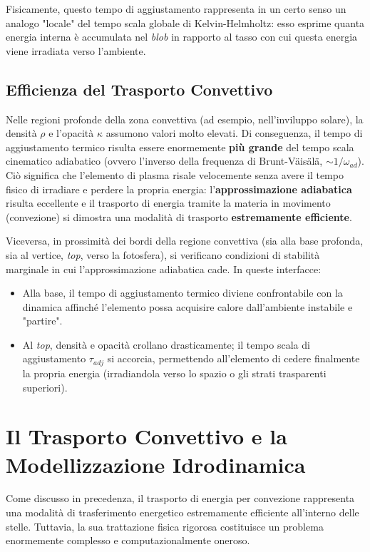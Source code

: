 Fisicamente, questo tempo di aggiustamento rappresenta in un certo senso un analogo "locale" del tempo scala globale di Kelvin-Helmholtz: esso esprime quanta energia interna è accumulata nel \textit{blob} in rapporto al tasso con cui questa energia viene irradiata verso l'ambiente.

\subsection{Efficienza del Trasporto Convettivo}

Nelle regioni profonde della zona convettiva (ad esempio, nell'inviluppo solare), la densità $\rho$ e l'opacità $\kappa$ assumono valori molto elevati. Di conseguenza, il tempo di aggiustamento termico risulta essere enormemente \textbf{più grande} del tempo scala cinematico adiabatico (ovvero l'inverso della frequenza di Brunt-Väisälä, $\sim 1/\omega_{ad}$).
Ciò significa che l'elemento di plasma risale velocemente senza avere il tempo fisico di irradiare e perdere la propria energia: l'\textbf{approssimazione adiabatica} risulta eccellente e il trasporto di energia tramite la materia in movimento (convezione) si dimostra una modalità di trasporto \textbf{estremamente efficiente}.

Viceversa, in prossimità dei bordi della regione convettiva (sia alla base profonda, sia al vertice, \textit{top}, verso la fotosfera), si verificano condizioni di stabilità marginale in cui l'approssimazione adiabatica cade. In queste interfacce:
\begin{itemize}
\item Alla base, il tempo di aggiustamento termico diviene confrontabile con la dinamica affinché l'elemento possa acquisire calore dall'ambiente instabile e "partire".
\item Al \textit{top}, densità e opacità crollano drasticamente; il tempo scala di aggiustamento $\tau_{adj}$ si accorcia, permettendo all'elemento di cedere finalmente la propria energia (irradiandola verso lo spazio o gli strati trasparenti superiori).
\end{itemize}

\section{Il Trasporto Convettivo e la Modellizzazione Idrodinamica}

Come discusso in precedenza, il trasporto di energia per convezione rappresenta una modalità di trasferimento energetico estremamente efficiente all'interno delle stelle. Tuttavia, la sua trattazione fisica rigorosa costituisce un problema enormemente complesso e computazionalmente oneroso.

